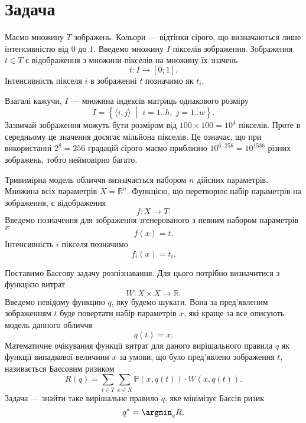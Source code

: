 \section{Задача}

Маємо множину $T$ зображень.
Кольори --- відтінки сірого, що визначаються лише інтенсивністю від $0$ до $1$.
Введемо множину $I$ пікселів зображення.
Зображення $t \in T$ є відображення з множини пікселів на множину їх значень
\begin{equation*}
  t: I \rightarrow \left[ 0; 1 \right].
\end{equation*}
Інтенсивність пікселя $i$ в зображенні $t$ позначимо як $t_i$.

Взагалі кажучи, $I$ --- множина індексів матриць однакового розміру
\begin{equation*}
  I = \left\{ \langle i, j \rangle
    \;\middle|\; i = \overline{1..h},\; j = \overline{1..w}\right\}.
\end{equation*}
Зазвичай зображення можуть бути розміром від $100\times100=10^4$ пікселів.
Проте в середньому це значення досягає мільйона пікселів.
Це означає,
що при використанні $2^8=256$ градацій сірого маємо приблизно
$10^{6 \cdot 256}=10^{1536}$ різних зображень, тобто неймовірно багато.

Тривимірна модель обличчя визначається набором $n$ дійсних параметрів.
Множина всіх параметрів $X = \mathbb{R}^n$.
Функцією, що перетворює набір параметрів на зображення, є відображення
\begin{equation*}
  f: X \rightarrow T.
\end{equation*}
Введемо позначення для зображення згенерованого з певним набором параметрів $x$
\begin{equation*}
  f\left( x \right) = t.
\end{equation*}
Інтенсивність $i$ пікселя позначимо
\begin{equation*}
  f_i\left( x \right) = t_i.
\end{equation*}

Поставимо Баєсову задачу розпізнавання.
Для цього потрібно визначитися з функцією витрат
\cite{berger1980}
\begin{equation*}
  W: X \times X \rightarrow \mathbb{R}.
\end{equation*}
Введемо невідому функцию $q$, яку будемо шукати.
Вона за пред'явленим зображенням $t$ буде повертати набір параметрів $x$,
які краще за все описують модель данного обличчя
\begin{equation*}
  q\left( t \right) = x.
\end{equation*}
Математичне очікування функції витрат для даного вирішального правила $q$
як функції випадкової величини $x$ за умови,
що було пред'явлено зображення $t$, називається Баєсовим ризиком
\begin{equation*}
  R \left( q \right)
  = \sum\limits_{t \in T} \sum\limits_{x \in X}
    \mathbb{P} \left( x,  q\left( t \right) \right)
    \cdot W \left( x, q\left( t \right) \right).
\end{equation*}
Задача --- знайти таке вирішальне правило $q$, яке мінімізує Баєсів ризик
\begin{equation*}
  q^* = \argmin_q R.
\end{equation*}

